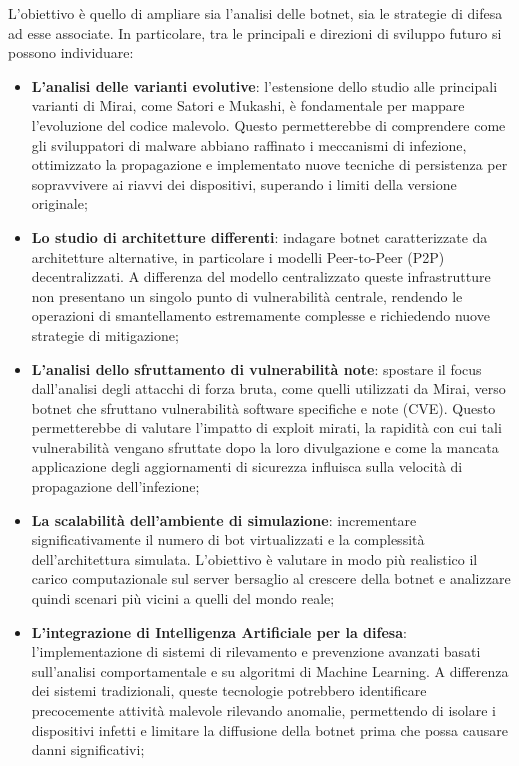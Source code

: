 L'obiettivo è quello di ampliare sia l’analisi delle botnet, sia le strategie di difesa ad esse associate. In particolare, tra le principali e direzioni di sviluppo futuro si possono individuare:
\begin{itemize} 
\item \textbf{L’analisi delle varianti evolutive}: l’estensione dello studio alle principali varianti di Mirai, come Satori e Mukashi, è fondamentale per mappare l'evoluzione del codice malevolo. Questo permetterebbe di comprendere come gli sviluppatori di malware abbiano raffinato i meccanismi di infezione, ottimizzato la propagazione e implementato nuove tecniche di persistenza per sopravvivere ai riavvi dei dispositivi, superando i limiti della versione originale;

\item \textbf{Lo studio di architetture differenti}: indagare botnet caratterizzate da architetture alternative, in particolare i modelli Peer-to-Peer (P2P) decentralizzati. A differenza del modello centralizzato queste infrastrutture non presentano un singolo punto di vulnerabilità centrale, rendendo le operazioni di smantellamento estremamente complesse e richiedendo nuove strategie di mitigazione;

\item \textbf{L’analisi dello sfruttamento di vulnerabilità note}: spostare il focus dall'analisi degli attacchi di forza bruta, come quelli utilizzati da Mirai, verso botnet che sfruttano vulnerabilità software specifiche e note (CVE). Questo permetterebbe di valutare l’impatto di exploit mirati, la rapidità con cui tali vulnerabilità vengano sfruttate dopo la loro divulgazione e come la mancata applicazione degli aggiornamenti di sicurezza influisca sulla velocità di propagazione dell'infezione;

\item \textbf{La scalabilità dell’ambiente di simulazione}: incrementare significativamente il numero di bot virtualizzati e la complessità dell'architettura simulata. L'obiettivo è valutare in modo più realistico il carico computazionale sul server bersaglio al crescere della botnet e analizzare quindi scenari più vicini a quelli del mondo reale;

\item \textbf{L’integrazione di Intelligenza Artificiale per la difesa}: l’implementazione di sistemi di rilevamento e prevenzione avanzati basati sull’analisi comportamentale e su algoritmi di Machine Learning. A differenza dei sistemi tradizionali, queste tecnologie potrebbero identificare precocemente attività malevole rilevando anomalie, permettendo di isolare i dispositivi infetti e limitare la diffusione della botnet prima che possa causare danni significativi;


\end{itemize}
